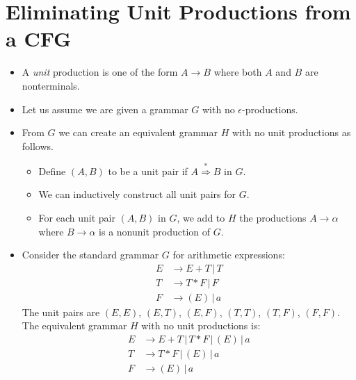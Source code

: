 \documentclass[]{article}
\begin{document}
\section{Eliminating Unit Productions from a CFG}
  \begin{itemize}
    \item A \emph{unit} production is one of the form $A \rightarrow B$ where both 
    $A$ and $B$ are nonterminals.
    \item Let us assume we are given a grammar $G$ with no $\epsilon$-productions.
    \item From $G$ we can create an equivalent grammar $H$ with no unit 
    productions as follows.
      \begin{itemize}
        \item Define $(A, B)$ to be a unit pair if $A \overset{*}{\Rightarrow} B$ 
        in $G$.
        \item We can inductively construct all unit pairs for $G$.
        \item For each unit pair $(A,B)$ in $G$, we add to $H$ the productions $A 
        \rightarrow \alpha$ where $B \rightarrow \alpha$ is a nonunit production 
        of $G$.
      \end{itemize}
    \item Consider the standard grammar $G$ for arithmetic expressions:
      \begin{align*}
        E &\rightarrow E + T \, | \, T \\
        T &\rightarrow T * F \, | \, F \\
        F &\rightarrow ( E ) \, | \, a
      \end{align*}
    The unit pairs are $(E,E)$, $(E,T)$, $(E,F)$, $(T,T)$, $(T,F)$, $(F,F)$. \\
    The equivalent grammar $H$ with no unit productions is:
      \begin{align*}
        E &\rightarrow E + T \, | \, T * F \, | \, ( E ) \, | \, a \\
        T &\rightarrow T * F \, | \, ( E ) \, | \, a               \\
        F &\rightarrow ( E ) \, | \, a                             \\
      \end{align*}
  \end{itemize}
  
\end{document}
